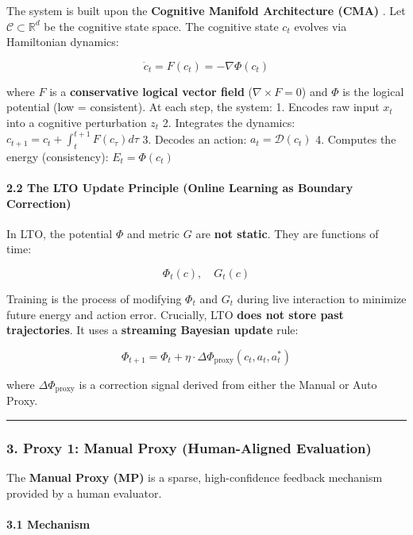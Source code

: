 \documentclass[
  11pt,
  a4paper,
]{article}
\begin{document}
The system is built upon the \textbf{Cognitive Manifold Architecture
(CMA)} . Let \(\mathcal{C} \subset \mathbb{R}^d\) be the cognitive state
space. The cognitive state \(c_t\) evolves via Hamiltonian dynamics:

\[\dot{c}_t = F(c_t) = -\nabla \Phi(c_t)\]

where \(F\) is a \textbf{conservative logical vector field}
(\(\nabla \times F = 0\)) and \(\Phi\) is the logical potential (low =
consistent). At each step, the system: 1. Encodes raw input \(x_t\) into
a cognitive perturbation \(z_t\) 2. Integrates the dynamics:
\(c_{t+1} = c_t + \int_t^{t+1} F(c_\tau) d\tau\) 3. Decodes an action:
\(a_t = \mathcal{D}(c_t)\) 4. Computes the energy (consistency):
\(E_t = \Phi(c_t)\)

\paragraph{2.2 The LTO Update Principle (Online Learning as Boundary
Correction)}\label{the-lto-update-principle-online-learning-as-boundary-correction}

In LTO, the potential \(\Phi\) and metric \(G\) are \textbf{not static}.
They are functions of time:

\[\Phi_t(c), \quad G_t(c)\]

Training is the process of modifying \(\Phi_t\) and \(G_t\) during live
interaction to minimize future energy and action error. Crucially, LTO
\textbf{does not store past trajectories}. It uses a \textbf{streaming
Bayesian update} rule:

\[\Phi_{t+1} = \Phi_t + \eta \cdot \Delta \Phi_{\text{proxy}}(c_t, a_t, a_t^*)\]

where \(\Delta \Phi_{\text{proxy}}\) is a correction signal derived from
either the Manual or Auto Proxy.

\begin{center}\rule{0.5\linewidth}{0.5pt}\end{center}

\subsubsection{3. Proxy 1: Manual Proxy (Human-Aligned
Evaluation)}\label{proxy-1-manual-proxy-human-aligned-evaluation}

The \textbf{Manual Proxy (MP)} is a sparse, high-confidence feedback
mechanism provided by a human evaluator.

\paragraph{3.1 Mechanism}\label{mechanism}
\end{document}
